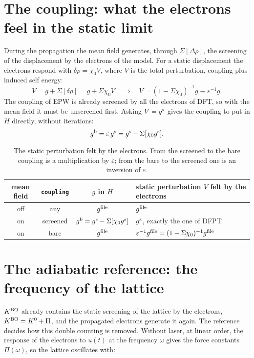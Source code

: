 \documentclass[11pt]{article}
\newcommand{\Dr}{\Delta\rho}
\newcommand{\gs}{g^{\rm s}}
\newcommand{\gb}{g^{\rm b}}
\newcommand{\gf}{g^{\rm file}}
\newcommand{\KBO}{K^{\rm BO}}
\begin{document}
\section{The coupling: what the electrons feel in the static limit}\label{sec:coupling}
During the propagation the mean field generates, through $\Sigma[\Dr]$, the screening of the displacement by the
electrons of the model. For a static displacement the electrons respond with $\delta\rho = \chi_0 V$, where $V$ is the
total perturbation, coupling plus induced self energy:
\begin{equation}
V = g + \Sigma[\delta\rho] = g + \Sigma\chi_0 V \quad\Longrightarrow\quad V = (1-\Sigma\chi_0)^{-1} g \equiv \varepsilon^{-1} g .
\end{equation}
The coupling of EPW is already screened by all the electrons of DFT, so with the mean field it must be unscreened
first. Asking $V=\gs$ gives the coupling to put in $H$ directly, without iterations:
\begin{equation}
\gb = \varepsilon\,\gs = \gs - \Sigma[\chi_0\gs].
\end{equation}

\begin{table}[h]
\centering
\renewcommand{\arraystretch}{1.4}
\begin{tabular}{@{}c c c l@{}}
\toprule
mean field & \texttt{coupling} & $g$ in $H$ & static perturbation $V$ felt by the electrons \\
\midrule
off & any      & $\gf$ & $\gf$ \\
on  & screened & $\gb=\gs-\Sigma[\chi_0\gs]$ & $\gs$, exactly the one of DFPT \\
on  & bare     & $\gf$ & $\varepsilon^{-1}\gf = (1-\Sigma\chi_0)^{-1}\gf$ \\
\bottomrule
\end{tabular}
\caption{The static perturbation felt by the electrons. From the screened to the bare coupling is a multiplication
by $\varepsilon$; from the bare to the screened one is an inversion of $\varepsilon$.}
\label{tab:coupling}
\end{table}

\section{The adiabatic reference: the frequency of the lattice}\label{sec:reference}
$\KBO$ already contains the static screening of the lattice by the electrons, $\KBO = K^0 + \Pi$, and the propagated
electrons generate it again. The reference decides how this double counting is removed. Without laser, at linear order,
the response of the electrons to $u(t)$ at the frequency $\omega$ gives the force constants $\Pi(\omega)$, so the
lattice oscillates with:
\end{document}
